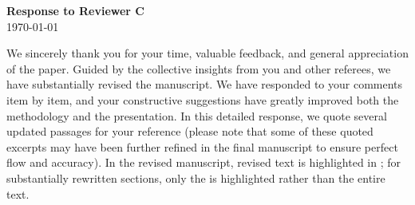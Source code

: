 \documentclass[11pt]{article}
\begin{document}
\begin{center}
    {\LARGE \textbf{Response to Reviewer C}} \\[1em]
    {\large \today}
\end{center}
\vspace{2em} %
\normalsize



We sincerely thank you for your time, valuable feedback, and general appreciation of the paper. Guided by the collective insights from you and other referees, we have substantially revised the manuscript. We have responded to your comments item by item, and your constructive suggestions have greatly improved both the methodology and the presentation. In this detailed response, we quote several updated passages for your reference (please note that some of these quoted excerpts may have been further refined in the final manuscript to ensure perfect flow and accuracy). In the revised manuscript, revised text is highlighted in ; for substantially rewritten sections, only the  is highlighted rather than the entire text. 
\end{document}
